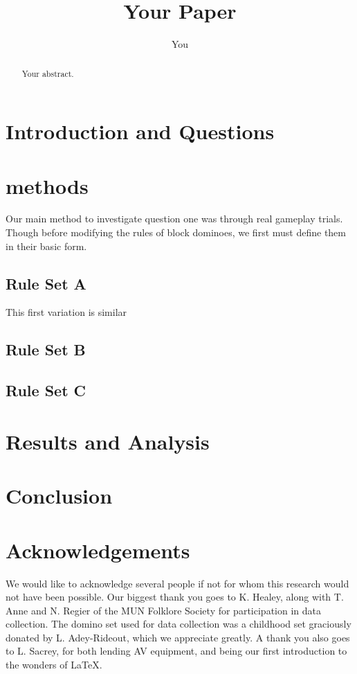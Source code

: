 \documentclass{article}
\title{Your Paper}
\author{You}
\begin{document}
\maketitle

\begin{abstract}
Your abstract.
\end{abstract}

\section{Introduction and Questions}
\section{methods}
Our main method to investigate question one was through real gameplay trials. Though before modifying the rules of block dominoes, we first must define them in their basic form. %
\subsection{Rule Set A}
This first variation is similar
\subsection{Rule Set B}
\subsection{Rule Set C}

\section{Results and Analysis}
\section{Conclusion}

\section*{Acknowledgements}
We would like to acknowledge several people if not for whom this research would not have been possible. Our biggest thank you goes to K. Healey, along with T. Anne and N. Regier of the MUN Folklore Society for participation in data collection. The domino set used for data collection was a childhood set graciously donated by L. Adey-Rideout, which we appreciate greatly. A thank you also goes to L. Sacrey, for both lending AV equipment, and being our first introduction to the wonders of \LaTeX.



\end{document}
